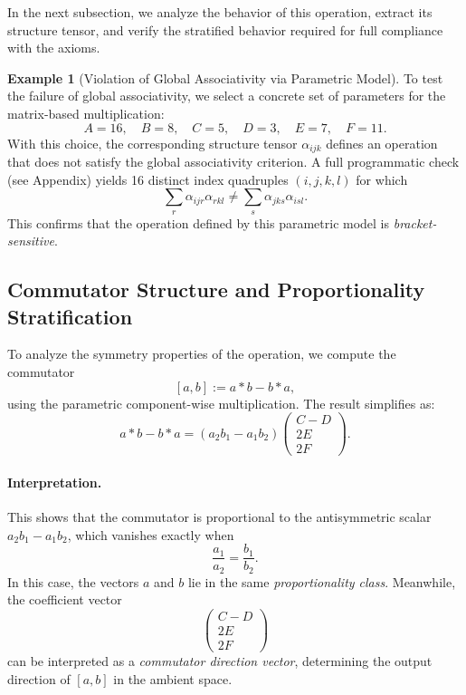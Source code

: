 \documentclass[12pt]{article}
\theoremstyle{definition}
\newtheorem{example}{Example}[section]
\theoremstyle{plain}
\theoremstyle{remark}
\begin{document}
In the next subsection, we analyze the behavior of this operation, extract its structure tensor, and verify the stratified behavior required for full compliance with the axioms.

\begin{example}[Violation of Global Associativity via Parametric Model]
To test the failure of global associativity, we select a concrete set of parameters for the matrix-based multiplication:
\[
A = 16,\quad B = 8,\quad C = 5,\quad D = 3,\quad E = 7,\quad F = 11.
\]
With this choice, the corresponding structure tensor \( \alpha_{ijk} \) defines an operation that does not satisfy the global associativity criterion. A full programmatic check (see Appendix) yields 16 distinct index quadruples \( (i,j,k,l) \) for which
\[
\sum_r \alpha_{ijr} \alpha_{rkl} \ne \sum_s \alpha_{jks} \alpha_{isl}.
\]
This confirms that the operation defined by this parametric model is \emph{bracket-sensitive}.
\end{example}

\subsection{Commutator Structure and Proportionality Stratification}

To analyze the symmetry properties of the operation, we compute the commutator
\[
[a, b] := a * b - b * a,
\]
using the parametric component-wise multiplication. The result simplifies as:
\[
a * b - b * a = (a_2 b_1 - a_1 b_2)
\begin{pmatrix}
C - D \\
2 E \\
2 F
\end{pmatrix}.
\]

\paragraph{Interpretation.}
This shows that the commutator is proportional to the antisymmetric scalar \( a_2 b_1 - a_1 b_2 \), which vanishes exactly when
\[
\frac{a_1}{a_2} = \frac{b_1}{b_2}.
\]
In this case, the vectors \( a \) and \( b \) lie in the same \emph{proportionality class}. Meanwhile, the coefficient vector
\[
\begin{pmatrix}
C - D \\
2E \\
2F
\end{pmatrix}
\]
can be interpreted as a \emph{commutator direction vector}, determining the output direction of \( [a, b] \) in the ambient space.
\end{document}
